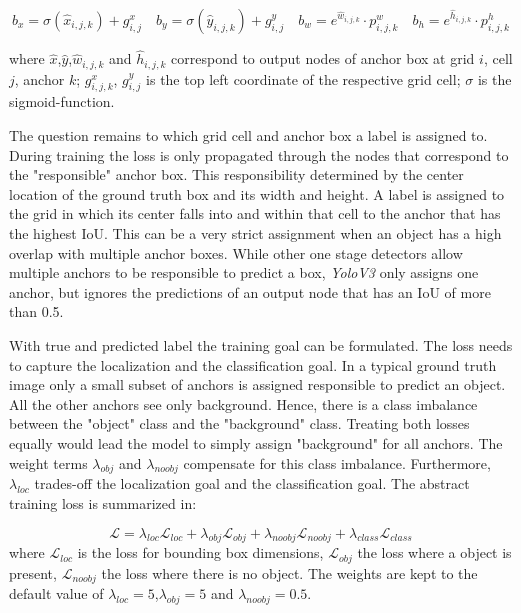 \begin{equation}
\label{sec:encoding}
b_x = \sigma(\hat x_{i,j,k}) + g^x_{i,j}\quad
b_y = \sigma(\hat y_{i,j,k}) + g^y_{i,j}\quad
b_w = e^{\hat w_{i,j,k}} \cdot p^w_{i,j,k}\quad
b_h = e^{\hat h_{i,j,k}} \cdot p^h_{i,j,k}
\end{equation}

where $\hat{x}$,$\hat{y}$,$\hat w_{i,j,k}$ and $\hat h_{i,j,k}$ correspond to output nodes of anchor box at grid $i$, cell $j$, anchor $k$; $g^x_{i,j,k}$, $g^y_{i,j}$ is the top left coordinate of the respective grid cell; $\sigma$ is the sigmoid-function.

The question remains to which grid cell and anchor box a label is assigned to. During training the loss is only propagated through the nodes that correspond to the "responsible" anchor box. This responsibility determined by the center location of the ground truth box and its width and height. A label is assigned to the grid in which its center falls into and within that cell to the anchor that has the highest \ac{IoU}. This can be a very strict assignment when an object has a high overlap with multiple anchor boxes. While other one stage detectors allow multiple anchors to be responsible to predict a box, \textit{YoloV3} only assigns one anchor, but ignores the predictions of an output node that has an \ac{IoU} of more than 0.5.

With true and predicted label the training goal can be formulated. The loss needs to capture the localization and the classification goal. In a typical ground truth image only a small subset of anchors is assigned responsible to predict an object. All the other anchors see only background. Hence, there is a class imbalance between the "object" class and the "background" class. Treating both losses equally would lead the model to simply assign "background" for all anchors. The weight terms $\lambda_{obj}$ and $\lambda_{noobj}$ compensate for this class imbalance. Furthermore, $\lambda_{loc}$ trades-off the localization goal and the classification goal. The abstract training loss is summarized in: 

\begin{equation}
\mathcal{L} = \lambda_{loc}\mathcal{L}_{loc} + \lambda_{obj}\mathcal{L}_{obj} + \lambda_{noobj}\mathcal{L}_{noobj} + \lambda_{class}\mathcal{L}_{class}
\end{equation}
where $\mathcal{L}_{loc}$ is the loss for bounding box dimensions, $\mathcal{L}_{obj}$ the loss where a object is present, $\mathcal{L}_{noobj}$ the loss where there is no object. The weights are kept to the default value of $\lambda_{loc} = 5$,$\lambda_{obj} = 5$ and $\lambda_{noobj} = 0.5$.

